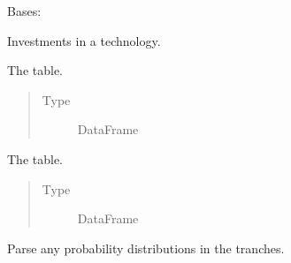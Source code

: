 \documentclass[letterpaper,10pt,english]{sphinxmanual}
\begin{document}
\begin{fulllineitems}
\label{\detokenize{tyche:tyche.Investments.Investments}}
Bases: 

Investments in a technology.

\begin{fulllineitems}
\label{\detokenize{tyche:tyche.Investments.Investments.tranches}}
The  table.
\begin{quote}\begin{description}
\item[{Type}] \leavevmode
DataFrame

\end{description}\end{quote}

\end{fulllineitems}


\begin{fulllineitems}
\label{\detokenize{tyche:tyche.Investments.Investments.investments}}
The  table.
\begin{quote}\begin{description}
\item[{Type}] \leavevmode
DataFrame

\end{description}\end{quote}

\end{fulllineitems}


\begin{fulllineitems}
\label{\detokenize{tyche:tyche.Investments.Investments.compile}}
Parse any probability distributions in the tranches.


\end{fulllineitems}
\end{fulllineitems}
\end{document}
